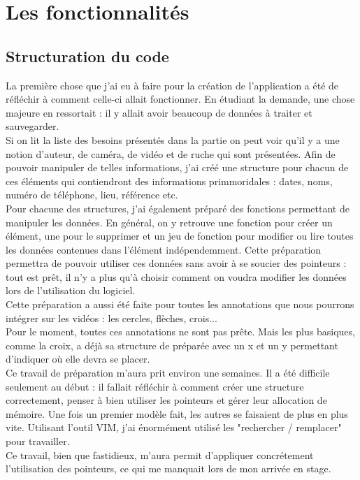 \documentclass[11pt,french,a4paper]{report}
\begin{document}
    \section{Les fonctionnalités} 
        \subsection{Structuration du code}
La première chose que j'ai eu à faire pour la création de l'application a été de réfléchir à comment celle-ci allait fonctionner.
En étudiant la demande, une chose majeure en ressortait : il y allait avoir beaucoup de données à traiter et sauvegarder. \\
Si on lit la liste des besoins présentés dans la partie %
on peut voir qu'il y a une notion d'auteur, de caméra, de vidéo et de ruche qui sont présentées. Afin de pouvoir manipuler de telles informations, 
j'ai créé une structure pour chacun de ces éléments qui contiendront des informations primmoridales : dates, noms, numéro de téléphone, lieu, 
référence etc. \\
Pour chacune des structures, j'ai également préparé des fonctions permettant de manipuler les données. En général, on y retrouve 
une fonction pour créer un élément, une pour le supprimer et un jeu de fonction pour modifier ou lire toutes les données contenues dans l'élément
indépendemment. Cette préparation permettra de pouvoir utiliser ces données sans avoir à se soucier des pointeurs : tout est prêt, il n'y
a plus qu'à choisir comment on voudra modifier les données lors de l'utilisation du logiciel. \\
Cette préparation a aussi été faite pour toutes les annotations que nous pourrons intégrer sur les vidéos : les cercles, flèches, crois... \\
Pour le moment, toutes ces annotations ne sont pas prête. Mais les plus basiques, comme la croix, a déjà sa structure de préparée avec un x et un y 
permettant d'indiquer où elle devra se placer. \\
Ce travail de préparation m'aura prit environ une semaines. Il a été difficile seulement au début : il fallait réfléchir 
à comment créer une structure correctement, penser à bien utiliser les pointeurs et gérer leur allocation de
mémoire. Une fois un premier modèle fait, les autres se faisaient de plus en plus vite. Utilisant l'outil VIM, j'ai 
énormément utilisé les "rechercher / remplacer" pour travailler. \\
Ce travail, bien que fastidieux, m'aura permit d'appliquer concrétement l'utilisation des pointeurs, ce qui 
me manquait lors de mon arrivée en stage. \\ 
\end{document}
